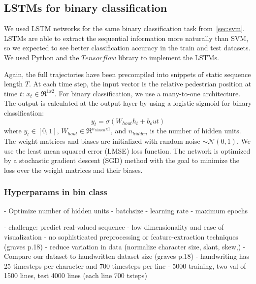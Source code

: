 \subsection{LSTMs for binary classification}
We used LSTM networks for the same binary classification task from~\cref{sec:svm}.
LSTMs are able to extract the sequential information more naturally than SVM, so we expected to see better classification accuracy in the train and test datasets.
We used Python and the $\textit{Tensorflow}$ library to implement the LSTMs.

Again, the full trajectories have been precompiled into snippets of static sequence length $T$.
At each time step, the input vector is the relative pedestrian position at time $t$: $x_t \in \Re^{1x2}$.
For binary classification, we use a many-to-one architecture.
The output is calculated at the output layer by using a logistic sigmoid for binary classification:
\begin{equation}
y_t = \sigma(W_{hout}h_t + b_out)
\label{eq:bin_class_out} 
\end{equation}
where $y_t \in [0,1]$, $W_{hout} \in \Re^{n_{hidden} \text{x} 1}$, and $n_{hidden}$ is the number of hidden units.
The weight matrices and biases are initialized with random noise $\sim\mathcal{N}(0,1)$.
We use the least mean squared error (LMSE) loss function.
The network is optimized by a stochastic gradient descent (SGD) method with the goal to minimize the loss over the weight matrices and their biases.

\subsubsection{Hyperparams in bin class}
- Optimize number of hidden units
- batchsize
- learning rate
- maximum epochs
 


- challenge: predict real-valued sequence
- low dimensionality and ease of visualization
- no sophisticated preprocessing or feature-extraction techniques (graves p.18)
	- reduce variation in data (normalize character size, slant, skew,)
- Compare our dataset to handwritten dataset size (graves p.18)
- handwriting has 25 timesteps per character and 700 timesteps per line
- 5000 training, two val of 1500 lines, test 4000 lines (each line 700 tsteps)
